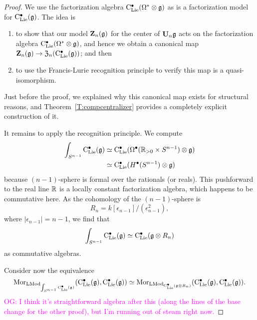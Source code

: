 \documentclass[11pt]{amsart}
\numberwithin{equation}{section}
\def\owen{\textcolor{magenta}{OG: }\textcolor{magenta}}
\begin{document}
\begin{proof}
We use the factorization algebra ${\rm C}_{\rm Lie}^\bullet(\Omega^* \otimes \mathfrak g)$ as is a factorization model for ${\rm C}_{\rm Lie}^\bullet(\mathfrak g)$.
The idea is 
\begin{enumerate}
\item to show that our model $\mathbf Z_n(\mathfrak g)$ for the center of $\mathbf U_n \mathfrak g$ acts on the factorization algebra ${\rm C}_{\rm Lie}^\bullet(\Omega^* \otimes \mathfrak g)$, and hence we obtain a canonical map $\mathbf Z_n(\mathfrak g) \to {\frak Z}_n({\rm C}_{\rm Lie}^\bullet(\mathfrak g))$; and then
\item to use the Francis-Lurie recognition principle to verify this map is a quasi-isomorphism.
\end{enumerate}
Just before the proof, we explained why this canonical map exists for structural reasons,
and Theorem~\ref{T:compcentralizer} provides a completely explicit construction of it.

It remains to apply the recognition principle.
We compute
\begin{align*}
\int_{S^{n-1}}{\rm C}_{\rm Lie}^\bullet(\mathfrak g) 
&\simeq {\rm C}_{\rm Lie}^\bullet(\Omega^\bullet(\mathbb R_{> 0} \times S^{n-1}) \otimes \mathfrak g)\\
&\simeq {\rm C}_{\rm Lie}^\bullet(H^\bullet(S^{n-1}) \otimes \mathfrak g)
\end{align*}
because $(n-1)$-sphere is formal over the rationals (or reals). 
This pushforward to the real line $\mathbb R$ is a locally constant factorization algebra,
which happens to be commutative here.
As the cohomology of the $(n-1)$-sphere is 
\[
R_n = k[\epsilon_{n-1}]/(\epsilon_{n-1}^2),
\] 
where $|\epsilon_{n-1}| = n-1$,
we find that 
\[
\int_{S^{n-1}}{\rm C}_{\rm Lie}^\bullet(\mathfrak g) \simeq {\rm C}_{\rm Lie}^\bullet(\mathfrak g \otimes R_n)
\]
as commutative algebras.

Consider now the equivalence
\[
{\rm Mor}_{{\rm LMod}_{\int_{S^{n-1}} {\rm C}_{\rm Lie}^\bullet(\mathfrak g)}}({\rm C}_{\rm Lie}^\bullet(\mathfrak g), {\rm C}_{\rm Lie}^\bullet(\mathfrak g)) 
\simeq 
{\rm Mor}_{{\rm LMod}_{{\rm C}_{\rm Lie}^\bullet(\mathfrak g \otimes R_n)}} ({\rm C}_{\rm Lie}^\bullet(\mathfrak g), {\rm C}_{\rm Lie}^\bullet(\mathfrak g)).
\]
\owen{I think it's straightforward algebra after this (along the lines of the base change for the other proof), but I'm running out of steam right now.}
\end{proof}
\end{document}
